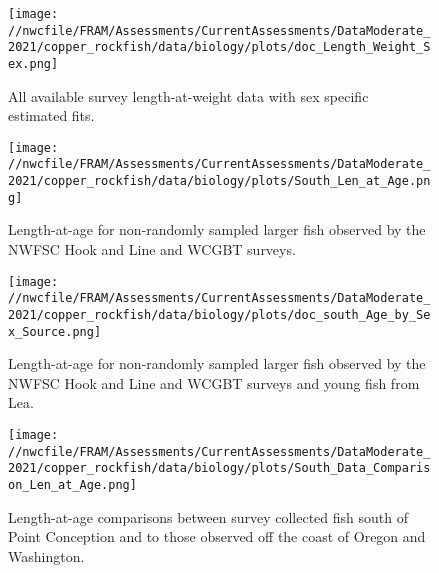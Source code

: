 \documentclass[11pt,
  english,
  a4paper,
]{article}
\begin{document}
\begin{figure}
\centering
\texttt{[image: //nwcfile/FRAM/Assessments/CurrentAssessments/DataModerate\_2021/copper\_rockfish/data/biology/plots/doc\_Length\_Weight\_Sex.png]}
\caption{All available survey length-at-weight data with sex specific estimated fits.\label{fig:len-weight}}
\end{figure}

\tagmcend\tagstructend


\begin{figure}
\centering
\texttt{[image: //nwcfile/FRAM/Assessments/CurrentAssessments/DataModerate\_2021/copper\_rockfish/data/biology/plots/South\_Len\_at\_Age.png]}
\caption{Length-at-age for non-randomly sampled larger fish observed by the NWFSC Hook and Line and WCGBT surveys.\label{fig:survey-len-at-age-data}}
\end{figure}

\tagmcend\tagstructend


\begin{figure}
\centering
\texttt{[image: //nwcfile/FRAM/Assessments/CurrentAssessments/DataModerate\_2021/copper\_rockfish/data/biology/plots/doc\_south\_Age\_by\_Sex\_Source.png]}
\caption{Length-at-age for non-randomly sampled larger fish observed by the NWFSC Hook and Line and WCGBT surveys and young fish from Lea.\label{fig:south-len-at-age-data}}
\end{figure}

\tagmcend\tagstructend


\begin{figure}
\centering
\texttt{[image: //nwcfile/FRAM/Assessments/CurrentAssessments/DataModerate\_2021/copper\_rockfish/data/biology/plots/South\_Data\_Comparison\_Len\_at\_Age.png]}
\caption{Length-at-age comparisons between survey collected fish south of Point Conception and to those observed off the coast of Oregon and Washington.\label{fig:len-at-age-comp}}
\end{figure}

\tagmcend\tagstructend

\clearpage
\end{document}

